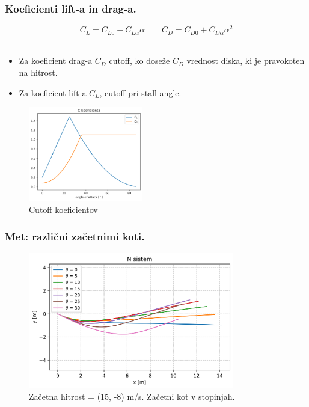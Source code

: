 \documentclass{beamer}
\begin{document}

\begin{frame}
\frametitle{Koeficienti lift-a in drag-a.}
\[C_L = C_{L0} + C_{L \alpha} \alpha \qquad C_D = C_{D0} + C_{D \alpha} \alpha^2\]\\
\begin{itemize}

\item Za koeficient drag-a $C_D$ cutoff, ko doseže $C_D$ vrednost diska, ki je pravokoten na hitrost.

\item Za koeficient lift-a $C_L$, cutoff pri stall angle.
\end{itemize}
\begin{figure}[H]
	\centering
	  \includegraphics[width=5cm]{koeficienta_cutoff.png}
	  \caption{Cutoff koeficientov}
\end{figure}
\end{frame}


\begin{frame}
\frametitle{Met: različni začetnimi koti.}

\begin{figure}[H]
	\centering
	  \includegraphics[width=9cm]{med_razlicni_koti.png}
	  \caption{Začetna hitrost = (15, -8) m/s. Začetni kot v stopinjah.}
\end{figure}
\end{frame}
\end{document}
